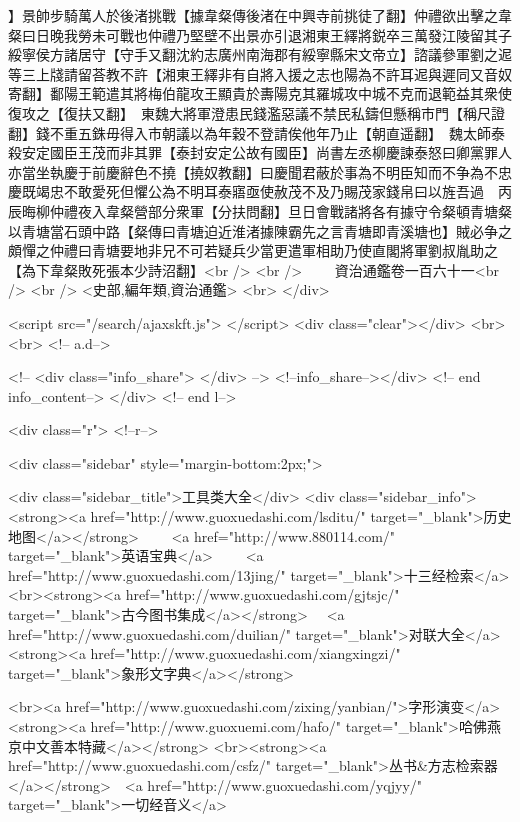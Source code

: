 】景帥步騎萬人於後渚挑戰【據韋粲傳後渚在中興寺前挑徒了翻】仲禮欲出擊之韋粲曰日晚我勞未可戰也仲禮乃堅壁不出景亦引退湘東王繹將鋭卒三萬發江陵留其子綏寧侯方諸居守【守手又翻沈約志廣州南海郡有綏寧縣宋文帝立】諮議參軍劉之迡等三上牋請留荅教不許【湘東王繹非有自將入援之志也陽為不許耳迡與遲同又音奴寄翻】鄱陽王範遣其將梅伯龍攻王顯貴於夀陽克其羅城攻中城不克而退範益其衆使復攻之【復扶又翻】　東魏大將軍澄患民錢濫惡議不禁民私鑄但懸稱市門【稱尺證翻】錢不重五銖毋得入市朝議以為年穀不登請俟他年乃止【朝直遥翻】　魏太師泰殺安定國臣王茂而非其罪【泰封安定公故有國臣】尚書左丞柳慶諫泰怒曰卿黨罪人亦當坐執慶于前慶辭色不撓【撓奴教翻】曰慶聞君蔽於事為不明臣知而不争為不忠慶既竭忠不敢愛死但懼公為不明耳泰寤亟使赦茂不及乃賜茂家錢帛曰以旌吾過　丙辰晦柳仲禮夜入韋粲營部分衆軍【分扶問翻】旦日會戰諸將各有據守令粲頓青塘粲以青塘當石頭中路【粲傳曰青塘迫近淮渚據陳霸先之言青塘即青溪塘也】賊必争之頗憚之仲禮曰青塘要地非兄不可若疑兵少當更遣軍相助乃使直閣將軍劉叔胤助之【為下韋粲敗死張本少詩沼翻】<br />
<br />
　　資治通鑑卷一百六十一<br />
<br />
<史部,編年類,資治通鑑>  <br>
   </div> 

<script src="/search/ajaxskft.js"> </script>
 <div class="clear"></div>
<br>
<br>
 <!-- a.d-->

 <!--
<div class="info_share">
</div> 
-->
 <!--info_share--></div>   <!-- end info_content-->
  </div> <!-- end l-->

<div class="r">   <!--r-->



<div class="sidebar"  style="margin-bottom:2px;">

 
<div class="sidebar_title">工具类大全</div>
<div class="sidebar_info">
<strong><a href="http://www.guoxuedashi.com/lsditu/" target="_blank">历史地图</a></strong>　　
<a href="http://www.880114.com/" target="_blank">英语宝典</a>　　
<a href="http://www.guoxuedashi.com/13jing/" target="_blank">十三经检索</a>　
<br><strong><a href="http://www.guoxuedashi.com/gjtsjc/" target="_blank">古今图书集成</a></strong>　
<a href="http://www.guoxuedashi.com/duilian/" target="_blank">对联大全</a>　<strong><a href="http://www.guoxuedashi.com/xiangxingzi/" target="_blank">象形文字典</a></strong>　

<br><a href="http://www.guoxuedashi.com/zixing/yanbian/">字形演变</a>　　<strong><a href="http://www.guoxuemi.com/hafo/" target="_blank">哈佛燕京中文善本特藏</a></strong>
<br><strong><a href="http://www.guoxuedashi.com/csfz/" target="_blank">丛书&方志检索器</a></strong>　<a href="http://www.guoxuedashi.com/yqjyy/" target="_blank">一切经音义</a>　　

